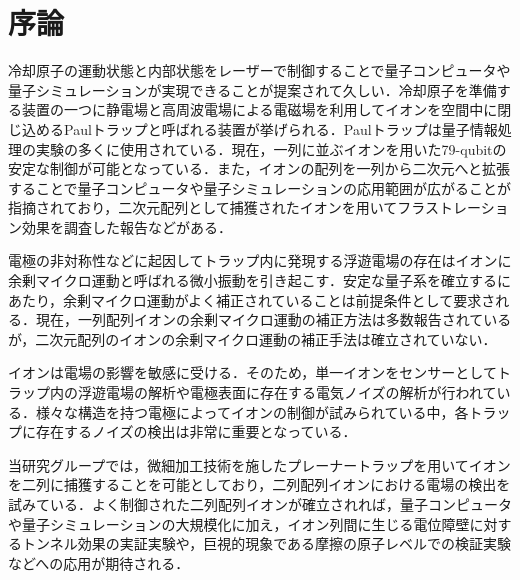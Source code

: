 \chapter{序論}
冷却原子の運動状態と内部状態をレーザーで制御することで量子コンピュータや量子シミュレーションが実現できることが提案されて久しい\cite{Cirac_1995}．冷却原子を準備する装置の一つに静電場と高周波電場による電磁場を利用してイオンを空間中に閉じ込めるPaulトラップと呼ばれる装置が挙げられる．Paulトラップは量子情報処理の実験の多くに使用されている．現在，一列に並ぶイオンを用いた79-qubitの安定な制御が可能となっている\cite{Wright_2019}．また，イオンの配列を一列から二次元へと拡張することで量子コンピュータや量子シミュレーションの応用範囲が広がることが指摘されており\cite{Cirac_2000}，二次元配列として捕獲されたイオンを用いてフラストレーション効果を調査した報告などがある\cite{Mielenz_2016}．

電極の非対称性などに起因してトラップ内に発現する浮遊電場の存在はイオンに余剰マイクロ運動と呼ばれる微小振動を引き起こす．安定な量子系を確立するにあたり，余剰マイクロ運動がよく補正されていることは前提条件として要求される．現在，一列配列イオンの余剰マイクロ運動の補正方法は多数報告されているが\cite{Berkeland_1998}\cite{Chen_2020}\cite{Timm_2015}，二次元配列のイオンの余剰マイクロ運動の補正手法は確立されていない．

イオンは電場の影響を敏感に受ける．そのため，単一イオンをセンサーとしてトラップ内の浮遊電場の解析\cite{Narayanan_2011}や電極表面に存在する電気ノイズの解析\cite{Danii_2014}が行われている．様々な構造を持つ電極によってイオンの制御が試みられている中，各トラップに存在するノイズの検出は非常に重要となっている．

当研究グループでは，微細加工技術を施したプレーナートラップを用いてイオンを二列に捕獲することを可能としており\cite{Tanaka_2021}，二列配列イオンにおける電場の検出を試みている．よく制御された二列配列イオンが確立されれば，量子コンピュータや量子シミュレーションの大規模化に加え，イオン列間に生じる電位障壁に対するトンネル効果の実証実験や，巨視的現象である摩擦の原子レベルでの検証実験などへの応用が期待される\cite{Tanaka_2021}\cite{L-Timm_2021}．
